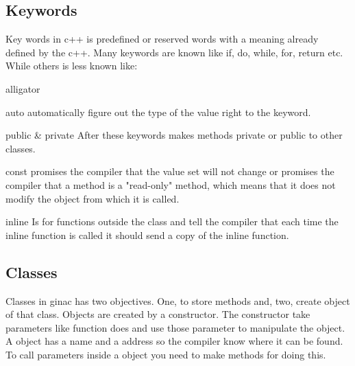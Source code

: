     \subsection{Keywords}
    Key words in c++ is predefined or reserved words with a meaning already defined by the c++. Many keywords are known like if, do, while, for, return etc. While others is less known like: 
    \begin{labeling}{alligator}
    \item [auto] automatically figure out the type of the value right to the keyword.
    \item [public \& private]  After these keywords makes methods private or public to other classes.
    \item[const] promises the compiler that the value set will not change or promises the compiler that a method is a "read-only" method, which means that it does not modify the object from which it is called.
    \item[inline] Is for functions outside the class and tell the compiler that each time the inline function is called it should send a copy of the inline function.
    \end{labeling}
    \subsection{Classes}
    Classes in ginac has two objectives. One, to store methods and, two, create object of that class. Objects are created by a constructor. The constructor take parameters like function does and use those parameter to manipulate the object. A object has a name and a address so the compiler know where it can be found. To call parameters inside a object you need to make methods for doing this.
